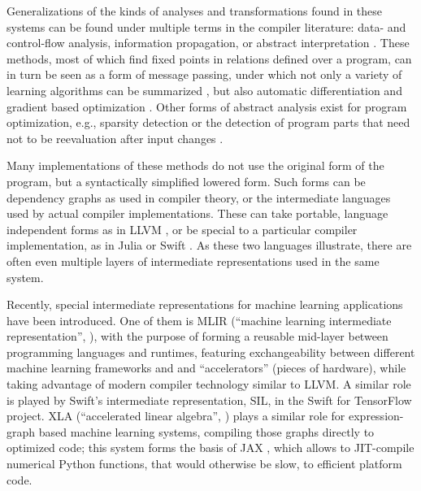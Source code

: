 Generalizations of the kinds of analyses and transformations found in these systems can be found
under multiple terms in the compiler literature: data- and control-flow analysis, information
propagation, or abstract interpretation \parencite{muchnick1997advanced,singer2018static}.  These
methods, most of which find fixed points in relations defined over a program, can in turn be seen as
a form of message passing, under which not only a variety of learning algorithms can be summarized
\parencite{minka2005divergence}, but also automatic differentiation \parencite{minka2019automatic}
and gradient based optimization \parencite{dauwels2005steepest}.  Other forms of abstract analysis
exist for program optimization, e.g., sparsity detection \parencite{gowda2019sparsity} or the
detection of program parts that need not to be reevaluation after input changes
\parencite{becker2020dynamic}.

Many implementations of these methods do not use the original form of the program, but a
syntactically simplified lowered form.  Such forms can be dependency graphs as used in compiler
theory, or the intermediate languages used by actual compiler implementations.  These can take
portable, language independent forms as in LLVM \parencite{llvmproject2019llvm}, or be special to a
particular compiler implementation, as in Julia \parencite{bezanson2017julia} or Swift
\parencite{apple2020swifta}.  As these two languages illustrate, there are often even multiple
layers of intermediate representations used in the same system.

Recently, special intermediate representations for machine learning applications have been
introduced.  One of them is MLIR (\enquote{machine learning intermediate representation},
\textcite{lattner2020mlir}), with the purpose of forming a reusable mid-layer between programming
languages and runtimes, featuring exchangeability between different machine learning frameworks and
and \enquote{accelerators} (pieces of hardware), while taking advantage of modern compiler
technology similar to LLVM.  A similar role is played by Swift's intermediate representation, SIL,
in the Swift for TensorFlow project.  XLA (\enquote{accelerated linear algebra},
\textcite{tensorflowdevelopers2020xla}) plays a similar role for expression-graph based machine
learning systems, compiling those graphs directly to optimized code; this system forms the basis of
JAX \parencite{bradbury2018jax}, which allows to JIT-compile numerical Python functions, that would
otherwise be slow, to efficient platform code.

